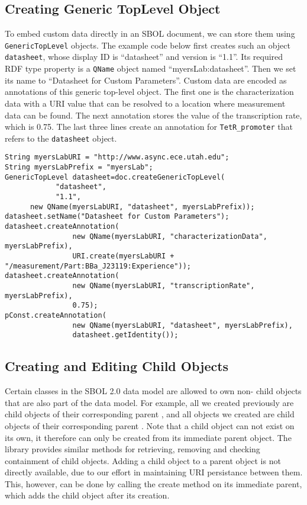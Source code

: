 \subsection*{Creating Generic TopLevel Object}
To embed custom data directly in an SBOL document, we can store them
using \lstinline+GenericTopLevel+ objects. The example code below first
creates such an object \lstinline+datasheet+, whose display ID is
``datasheet'' and version is ``1.1''. Its required RDF type property
is a \lstinline+QName+ object named
``myersLab:datasheet''. Then we set its name to
``Datasheet for Custom Parameters''. Custom data are encoded as annotations of this generic
top-level object. The first one is the characterization data with a
URI value that can be resolved to a location where measurement data
can be found. The next annotation stores the value of the
transcription rate, which is 0.75. The last three lines create
an annotation for \lstinline+TetR_promoter+ that refers to the
\lstinline+datasheet+ object.

\vspace{\abovedisplayskip}
\begin{minipage}{0.95\textwidth} 
\begin{lstlisting}
String myersLabURI = "http://www.async.ece.utah.edu";
String myersLabPrefix = "myersLab";	
GenericTopLevel datasheet=doc.createGenericTopLevel(
			"datasheet",
			"1.1",
      new QName(myersLabURI, "datasheet", myersLabPrefix));
datasheet.setName("Datasheet for Custom Parameters");		
datasheet.createAnnotation(
				new QName(myersLabURI, "characterizationData", myersLabPrefix), 
				URI.create(myersLabURI + "/measurement/Part:BBa_J23119:Experience"));				
datasheet.createAnnotation(
				new QName(myersLabURI, "transcriptionRate", myersLabPrefix), 
				0.75);
pConst.createAnnotation(
				new QName(myersLabURI, "datasheet", myersLabPrefix), 
				datasheet.getIdentity());
\end{lstlisting}
\end{minipage}

\subsection*{Creating and Editing Child Objects}
Certain classes in the SBOL 2.0 data model are allowed to own non- child
objects that are also part of the data model. For example, all
 we created previously are child objects of
their corresponding parent , and all
 objects we created are child objects of their corresponding
parent . Note that a child object can not exist on its
own, it therefore can only be created from its immediate parent
object. The library provides similar methods for retrieving,
removing and checking containment of child objects. Adding a child object to a parent
object is not directly available, due to our effort in maintaining
URI persistance between them. This, however, can be done by calling
the create method on its immediate parent, which adds the child object after its creation. 

